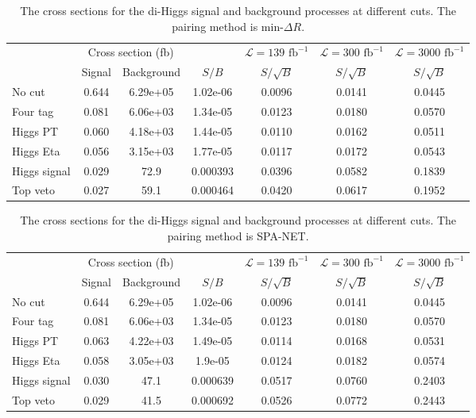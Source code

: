 \documentclass[12pt]{article}
\begin{document}
	\begin{table}[htpb]
		\centering
		\caption{The cross sections for the di-Higgs signal and background processes at different cuts. The pairing method is $\text{min-}\Delta R$.}
		\label{tab:diHiggs_signal_background_analysis_ATLAS_1000GeV_mindR}
		\begin{tabular}{l|cc|c|c|c|c}
						 & \multicolumn{2}{c|}{Cross section (fb)} &          & $\mathcal{L} = 139 \text{ fb}^{-1}$ & $\mathcal{L} = 300 \text{ fb}^{-1}$ & $\mathcal{L} = 3000 \text{ fb}^{-1}$ \\
						 & Signal           & Background           & $S / B$  & $S/\sqrt{B}$                        & $S/\sqrt{B}$                        & $S/\sqrt{B}$                         \\ \hline
			No cut       & 0.644 & 6.29e+05 & 1.02e-06 & 0.0096 & 0.0141 & 0.0445 \\
			Four tag     & 0.081 & 6.06e+03 & 1.34e-05 & 0.0123 & 0.0180 & 0.0570 \\
			Higgs PT     & 0.060 & 4.18e+03 & 1.44e-05 & 0.0110 & 0.0162 & 0.0511 \\
			Higgs Eta    & 0.056 & 3.15e+03 & 1.77e-05 & 0.0117 & 0.0172 & 0.0543 \\
			Higgs signal & 0.029 & 72.9     & 0.000393 & 0.0396 & 0.0582 & 0.1839 \\
			Top veto     & 0.027 & 59.1     & 0.000464 & 0.0420 & 0.0617 & 0.1952
		\end{tabular}
	\end{table}
	\begin{table}[htpb]
		\centering
		\caption{The cross sections for the di-Higgs signal and background processes at different cuts. The pairing method is SPA-NET.}
		\label{tab:diHiggs_signal_background_analysis_ATLAS_1000GeV_SPANET}
		\begin{tabular}{l|cc|c|c|c|c}
						 & \multicolumn{2}{c|}{Cross section (fb)} &          & $\mathcal{L} = 139 \text{ fb}^{-1}$ & $\mathcal{L} = 300 \text{ fb}^{-1}$ & $\mathcal{L} = 3000 \text{ fb}^{-1}$ \\
						 & Signal           & Background           & $S / B$  & $S/\sqrt{B}$                        & $S/\sqrt{B}$                        & $S/\sqrt{B}$                         \\ \hline
			No cut       & 0.644 & 6.29e+05 & 1.02e-06 & 0.0096 & 0.0141 & 0.0445 \\
			Four tag     & 0.081 & 6.06e+03 & 1.34e-05 & 0.0123 & 0.0180 & 0.0570 \\
			Higgs PT     & 0.063 & 4.22e+03 & 1.49e-05 & 0.0114 & 0.0168 & 0.0531 \\
			Higgs Eta    & 0.058 & 3.05e+03 & 1.9e-05  & 0.0124 & 0.0182 & 0.0574 \\
			Higgs signal & 0.030 & 47.1     & 0.000639 & 0.0517 & 0.0760 & 0.2403 \\
			Top veto     & 0.029 & 41.5     & 0.000692 & 0.0526 & 0.0772 & 0.2443
		\end{tabular}
	\end{table}
\end{document}
